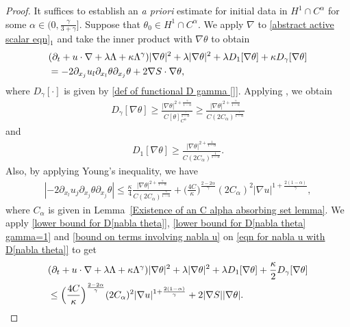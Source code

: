 \documentclass[reqno]{amsart}%
\theoremstyle{definition}
\theoremstyle{remark}
\numberwithin{equation}{section}
\newcommand{\dt}{\partial_t}
\newcommand{\1}{\mathbf{1}}
\numberwithin{equation}{section}
\numberwithin{theorem}{section}
\numberwithin{figure}{section}
\begin{document}
\begin{proof}
It suffices to establish an {\it a priori} estimate for initial data in $H^1\cap C^\alpha$ for some $\alpha\in(0,\frac{\gamma}{3+\gamma}]$. Suppose that $\theta_0\in H^1\cap C^{\alpha}$. We apply $\nabla$ to \eqref{abstract active scalar eqn}$_1$ and take the inner product with $\nabla\theta$ to obtain
\begin{align}\label{eqn for nabla u with D[nabla theta]}
&(\dt+u\cdot\nabla+\lambda\Lambda+\kappa\Lambda^\gamma)|\nabla\theta|^2+\lambda|\nabla\theta|^2+\lambda D_{1}[\nabla\theta]+\kappa D_{\gamma}[\nabla\theta]\notag\\
&=-2\partial_{x_j} u_l\partial_{x_l}\theta\partial_{x_j}\theta+2\nabla S\cdot\nabla\theta,
\end{align}
where $D_{\gamma}[\cdot]$ is given by \eqref{def of functional D gamma []}. Applying \cite[Theorem~2.2]{CV12}, we obtain
\begin{align}\label{lower bound for D[nabla theta]}
D_{\gamma}[\nabla\theta]\ge\frac{|\nabla\theta|^{2+\frac{\gamma}{1-\alpha}}}{C[\theta]^\frac{\gamma}{1-\alpha}_{C^\alpha}}\ge\frac{|\nabla\theta|^{2+\frac{\gamma}{1-\alpha}}}{C(2C_\alpha)^\frac{\gamma}{1-\alpha}}
\end{align}
and
\begin{align}\label{lower bound for D[nabla theta] gamma=1}
D_{1}[\nabla\theta]\ge\frac{|\nabla\theta|^{2+\frac{1}{1-\alpha}}}{C(2C_\alpha)^\frac{1}{1-\alpha}}.
\end{align}
Also, by applying Young's inequality, we have
\begin{align}\label{bound on terms involving nabla u}
|-2\partial_{x_l} u_j\partial_{x_j}\theta\partial_{x_j}\theta|\le \frac{\kappa}{4}\frac{|\nabla\theta|^{2+\frac{\gamma}{1-\alpha}}}{C(2C_\alpha)^\frac{\gamma}{1-\alpha}}+\Big(\frac{4C}{\kappa}\Big)^\frac{2-2\alpha}{\gamma}(2C_\alpha)^2|\nabla u|^{1+\frac{2(1-\alpha)}{\gamma}},
\end{align}
where $C_\alpha$ is given in Lemma~\ref{Existence of an C alpha absorbing set lemma}. We apply \eqref{lower bound for D[nabla theta]}, \eqref{lower bound for D[nabla theta] gamma=1} and \eqref{bound on terms involving nabla u} on \eqref{eqn for nabla u with D[nabla theta]} to get
\begin{align}\label{ineq for nabla u with D[nabla theta]}
&(\dt+u\cdot\nabla+\lambda\Lambda+\kappa\Lambda^\gamma)|\nabla\theta|^2+\lambda|\nabla\theta|^2+\lambda D_{1}[\nabla\theta]+\frac{\kappa}{2}D_{\gamma}[\nabla\theta]\notag\\
&\le\Big(\frac{4C}{\kappa}\Big)^\frac{2-2\alpha}{\gamma}(2C_\alpha)^2|\nabla u|^{1+\frac{2(1-\alpha)}{\gamma}}+2|\nabla S||\nabla \theta|.

\end{align}
\end{proof}
\end{document}
